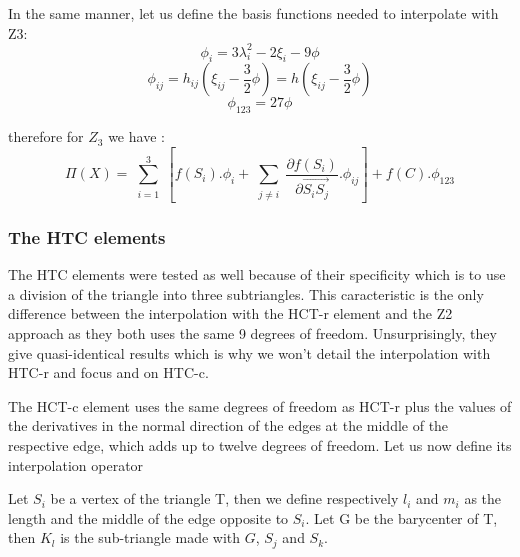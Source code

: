\documentclass[proc]{edpsmath}
\begin{document}
\noindent In the same manner, let us define the basis functions needed to interpolate with Z3: 
\begin{equation*}
\phi_i = 3\lambda_{i}^2 -2 \xi_i - 9 \phi
\end{equation*}
\begin{equation*}
\phi_{ij} = h_{ij} (\xi_{ij} -\frac{3}{2}\phi)=h (\xi_{ij} -\frac{3}{2}\phi)
\end{equation*}
\begin{equation*}
\phi_{123}=27\phi
\end{equation*}

\noindent therefore for $Z_3$ we have :
\begin{equation*}
 \Pi (X) = \sum \limits_{\substack{i=1 }}^{3}{ [f(S_i).\phi_i + \sum \limits_{\substack{j\neq i }}^{}{ \frac{\partial f(S_i)}{\partial  \overrightarrow{ S_i S_j } }.\phi_{ij} } ] } + f(C).\phi_{123}
\end{equation*}

\subsubsection{The HTC elements}
The HTC elements were tested as well because of their specificity which is to use a division of the triangle into three subtriangles. This caracteristic is the only difference between the interpolation with the HCT-r element and the  Z2 approach as they both uses the same 9 degrees of freedom. Unsurprisingly, they give quasi-identical results which is why we won't detail the interpolation with HTC-r and focus and on HTC-c.

The HCT-c  element uses the same degrees of freedom as HCT-r plus the values of the derivatives in the normal direction of the edges at the middle of the respective edge, which adds up to twelve degrees of freedom. Let us now define its interpolation operator

Let $S_i$ be a vertex of the triangle T, then we define respectively $l_i$ and $m_i$ as the length and the middle of the edge opposite to $S_i$. Let G be the barycenter of T, then $K_l$ is the sub-triangle made with $G$, $S_j$ and $S_k$.

\end{document}
